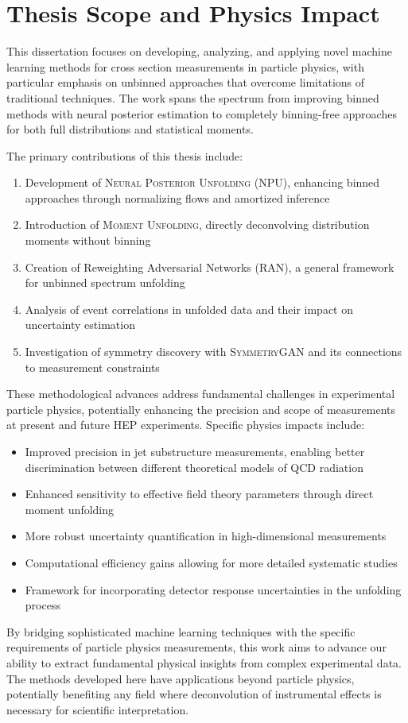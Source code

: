 \section{Thesis Scope and Physics Impact}

This dissertation focuses on developing, analyzing, and applying novel machine learning methods for cross section measurements in particle physics, with particular emphasis on unbinned approaches that overcome limitations of traditional techniques. The work spans the spectrum from improving binned methods with neural posterior estimation to completely binning-free approaches for both full distributions and statistical moments.

The primary contributions of this thesis include:

\begin{enumerate}
\item Development of \textsc{Neural Posterior Unfolding} (NPU), enhancing binned approaches through normalizing flows and amortized inference
\item Introduction of \textsc{Moment Unfolding}, directly deconvolving distribution moments without binning
\item Creation of Reweighting Adversarial Networks (RAN), a general framework for unbinned spectrum unfolding
\item Analysis of event correlations in unfolded data and their impact on uncertainty estimation
\item Investigation of symmetry discovery with \textsc{SymmetryGAN} and its connections to measurement constraints
\end{enumerate}

These methodological advances address fundamental challenges in experimental particle physics, potentially enhancing the precision and scope of measurements at present and future HEP experiments.
%
Specific physics impacts include:

\begin{itemize}
\item Improved precision in jet substructure measurements, enabling better discrimination between different theoretical models of QCD radiation
\item Enhanced sensitivity to effective field theory parameters through direct moment unfolding
\item More robust uncertainty quantification in high-dimensional measurements
\item Computational efficiency gains allowing for more detailed systematic studies
\item Framework for incorporating detector response uncertainties in the unfolding process
\end{itemize}

By bridging sophisticated machine learning techniques with the specific requirements of particle physics measurements, this work aims to advance our ability to extract fundamental physical insights from complex experimental data. The methods developed here have applications beyond particle physics, potentially benefiting any field where deconvolution of instrumental effects is necessary for scientific interpretation.